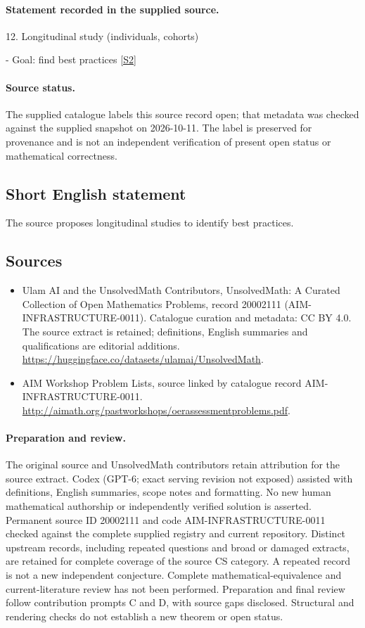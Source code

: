 \documentclass[11pt]{article}
\begin{document}
\paragraph{Statement recorded in the supplied source.}
12. Longitudinal study (individuals, cohorts)

- Goal: find best practices \href{http://aimath.org/pastworkshops/oerassessmentproblems.pdf}{[S2]}
\paragraph{Source status.}
The supplied catalogue labels this source record open; that metadata was checked against the supplied snapshot on 2026-10-11. The label is preserved for provenance and is not an independent verification of present open status or mathematical correctness.
\subsection{Short English statement}
The source proposes longitudinal studies to identify best practices.
\subsection{Sources}
\begin{itemize}
\item[S1] Ulam AI and the UnsolvedMath Contributors, UnsolvedMath: A Curated Collection of Open Mathematics Problems, record 20002111 (AIM-INFRASTRUCTURE-0011). Catalogue curation and metadata: CC BY 4.0. The source extract is retained; definitions, English summaries and qualifications are editorial additions.
\url{https://huggingface.co/datasets/ulamai/UnsolvedMath}.
\item[S2] AIM Workshop Problem Lists, source linked by catalogue record AIM-INFRASTRUCTURE-0011.
\url{http://aimath.org/pastworkshops/oerassessmentproblems.pdf}.
\end{itemize}
\paragraph{Preparation and review.}
The original source and UnsolvedMath contributors retain attribution for the source extract. Codex (GPT-6; exact serving revision not exposed) assisted with definitions, English summaries, scope notes and formatting. No new human mathematical authorship or independently verified solution is asserted. Permanent source ID 20002111 and code AIM-INFRASTRUCTURE-0011 checked against the complete supplied registry and current repository. Distinct upstream records, including repeated questions and broad or damaged extracts, are retained for complete coverage of the source CS category. A repeated record is not a new independent conjecture. Complete mathematical-equivalence and current-literature review has not been performed. Preparation and final review follow contribution prompts C and D, with source gaps disclosed. Structural and rendering checks do not establish a new theorem or open status.
\label{end:20002111}
\end{document}
